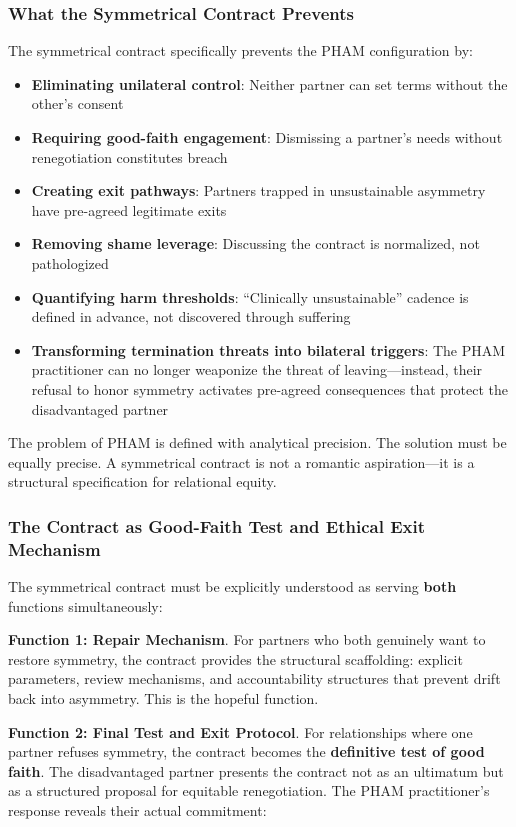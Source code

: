 \documentclass[12pt, letterpaper]{article}
\begin{document}
\subsubsection{What the Symmetrical Contract Prevents}

The symmetrical contract specifically prevents the PHAM configuration by:
\begin{itemize}
    \item \textbf{Eliminating unilateral control}: Neither partner can set terms without the other's consent
    \item \textbf{Requiring good-faith engagement}: Dismissing a partner's needs without renegotiation constitutes breach
    \item \textbf{Creating exit pathways}: Partners trapped in unsustainable asymmetry have pre-agreed legitimate exits
    \item \textbf{Removing shame leverage}: Discussing the contract is normalized, not pathologized
    \item \textbf{Quantifying harm thresholds}: ``Clinically unsustainable'' cadence is defined in advance, not discovered through suffering
    \item \textbf{Transforming termination threats into bilateral triggers}: The PHAM practitioner can no longer weaponize the threat of leaving---instead, their refusal to honor symmetry activates pre-agreed consequences that protect the disadvantaged partner
\end{itemize}

The problem of PHAM is defined with analytical precision. The solution must be equally precise. A symmetrical contract is not a romantic aspiration---it is a structural specification for relational equity.

\subsubsection{The Contract as Good-Faith Test and Ethical Exit Mechanism}

The symmetrical contract must be explicitly understood as serving \textbf{both} functions simultaneously:

\textbf{Function 1: Repair Mechanism}. For partners who both genuinely want to restore symmetry, the contract provides the structural scaffolding: explicit parameters, review mechanisms, and accountability structures that prevent drift back into asymmetry. This is the hopeful function.

\textbf{Function 2: Final Test and Exit Protocol}. For relationships where one partner refuses symmetry, the contract becomes the \textbf{definitive test of good faith}. The disadvantaged partner presents the contract not as an ultimatum but as a structured proposal for equitable renegotiation. The PHAM practitioner's response reveals their actual commitment:
\end{document}
